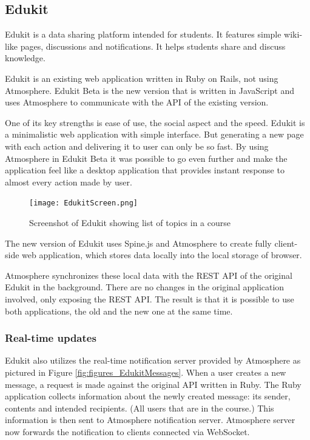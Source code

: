 \subsection{Edukit}
\label{sec:edukit}


Edukit is a data sharing platform intended for students. It features simple wiki-like pages, discussions and notifications. It helps students share and discuss knowledge.

Edukit is an existing web application written in Ruby on Rails, not using Atmosphere. Edukit Beta is the new version that is written in JavaScript and uses Atmosphere to communicate with the API of the existing version.

One of its key strengths is ease of use, the social aspect and the speed. Edukit is a minimalistic web application with simple interface. But generating a new page with each action and delivering it to user can only be so fast. By using Atmosphere in Edukit Beta it was possible to go even further and make the application feel like a desktop application that provides instant response to almost every action made by user.

\begin{figure}[htbp]
  \centering
    \texttt{[image: EdukitScreen.png]}
  \caption{Screenshot of Edukit showing list of topics in a course}
  \label{fig:figures_EdukitScreen}
\end{figure}

The new version of Edukit uses Spine.js and Atmosphere to create fully client-side web application, which stores data locally into the local storage of browser.

Atmosphere synchronizes these local data with the REST API of the original Edukit in the background. There are no changes in the original application involved, only exposing the REST API. The result is that it is possible to use both applications, the old and the new one at the same time.

\subsubsection{Real-time updates}

Edukit also utilizes the real-time notification server provided by Atmosphere as pictured in Figure \ref{fig:figures_EdukitMessages}. When a user creates a new message, a request is made against the original API written in Ruby.  The Ruby application collects information about the newly created message: its sender, contents and intended recipients. (All users that are in the course.) This information is then sent to Atmosphere notification server.  Atmosphere server now forwards the notification to clients connected via WebSocket. 

